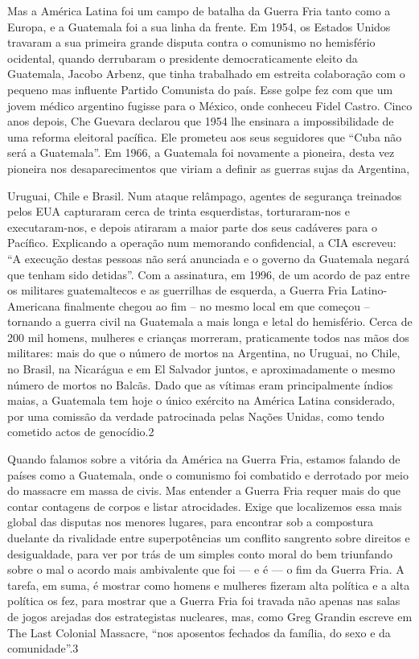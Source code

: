 \par 
Mas a América Latina foi um campo de batalha da Guerra Fria tanto como a Europa, e a Guatemala foi a sua linha da frente. Em 1954, os Estados Unidos travaram a sua primeira grande disputa contra o comunismo no hemisfério ocidental, quando derrubaram o presidente democraticamente eleito da Guatemala, Jacobo Arbenz, que tinha trabalhado em estreita colaboração com o pequeno mas influente Partido Comunista do país. Esse golpe fez com que um jovem médico argentino fugisse para o México, onde conheceu Fidel Castro. Cinco anos depois, Che Guevara declarou que 1954 lhe ensinara a impossibilidade de uma reforma eleitoral pacífica. Ele prometeu aos seus seguidores que “Cuba não será a Guatemala”. Em 1966, a Guatemala foi novamente a pioneira, desta vez pioneira nos desaparecimentos que viriam a definir as guerras sujas da Argentina,
 \par 
Uruguai, Chile e Brasil. Num ataque relâmpago, agentes de segurança treinados pelos EUA capturaram cerca de trinta esquerdistas, torturaram-nos e executaram-nos, e depois atiraram a maior parte dos seus cadáveres para o Pacífico. Explicando a operação num memorando confidencial, a CIA escreveu: “A execução destas pessoas não será anunciada e o governo da Guatemala negará que tenham sido detidas”. Com a assinatura, em 1996, de um acordo de paz entre os militares guatemaltecos e as guerrilhas de esquerda, a Guerra Fria Latino-Americana finalmente chegou ao fim – no mesmo local em que começou – tornando a guerra civil na Guatemala a mais longa e letal do hemisfério. Cerca de {\color{blue}200} mil homens, mulheres e crianças morreram, praticamente todos nas mãos dos militares: mais do que o número de mortos na Argentina, no Uruguai, no Chile, no Brasil, na Nicarágua e em El Salvador juntos, e aproximadamente o mesmo número de mortos no Balcãs. Dado que as vítimas eram principalmente índios maias, a Guatemala tem hoje o único exército na América Latina considerado, por uma comissão da verdade patrocinada pelas Nações Unidas, como tendo cometido actos de genocídio.{\color{blue}2}
 \par 
Quando falamos sobre a vitória da América na Guerra Fria, estamos falando de países como a Guatemala, onde o comunismo foi combatido e derrotado por meio do massacre em massa de civis. Mas entender a Guerra Fria requer mais do que contar contagens de corpos e listar atrocidades. Exige que localizemos essa mais global das disputas nos menores lugares, para encontrar sob a compostura duelante da rivalidade entre superpotências um conflito sangrento sobre direitos e desigualdade, para ver por trás de um simples conto moral do bem triunfando sobre o mal o acordo mais ambivalente que foi — e é — o fim da Guerra Fria. A tarefa, em suma, é mostrar como homens e mulheres fizeram alta política e a alta política os fez, para mostrar que a Guerra Fria foi travada não apenas nas salas de jogos arejadas dos estrategistas nucleares, mas, como Greg Grandin escreve em The Last Colonial Massacre, “nos aposentos fechados da família, do sexo e da comunidade”.{\color{blue}3}
